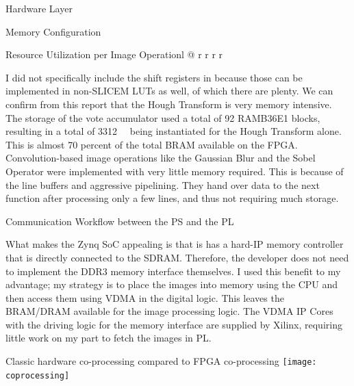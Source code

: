 \documentclass{matthijs}
\begin{document}
\begin{hoofdstuk}{Hardware Layer}
\begin{paragraaf}{Memory Configuration}
\begin{tabel}{Resource Utilization per Image Operation}{l @{\extracolsep{\fill}} r r r r}
			\end{tabel}

			I did not specifically include the shift registers in  because those can be implemented in non-SLICEM LUTs as well, of which there are plenty.
			We can confirm from this report that the Hough Transform is very memory intensive.
			The storage of the vote accumulator used a total of 92 RAMB36E1 blocks, resulting in a total of \qty{3312}{\kibi\bit} being instantiated for the Hough Transform alone.
			This is almost 70 percent of the total BRAM available on the FPGA.
			Convolution-based image operations like the Gaussian Blur and the Sobel Operator were implemented with very little memory required.
			This is because of the line buffers and aggressive pipelining.
			They hand over data to the next function after processing only a few lines, and thus not requiring much storage.

		\end{paragraaf}

		\clearpage

		\begin{paragraaf}{Communication Workflow between the PS and the PL}
			
			What makes the Zynq SoC appealing is that is has a hard-IP memory controller that is directly connected to the SDRAM.
			Therefore, the developer does not need to implement the DDR3 memory interface themselves.
			I used this benefit to my advantage; my strategy is to place the images into memory using the CPU and then access them using VDMA in the digital logic.
			This leaves the BRAM/DRAM available for the image processing logic.
			The VDMA IP Cores with the driving logic for the memory interface are supplied by Xilinx, requiring little work on my part to fetch the images in PL.

			\vspace{-0.6ex}
			\begin{figuur}{Classic hardware co-processing compared to FPGA co-processing}
				\singlespacing
				\texttt{[image: coprocessing]}
				\onehalfspacing
				\vspace{-2.3ex}
			\end{figuur}
			\vspace{-0.2ex}


\end{paragraaf}
\end{hoofdstuk}
\end{document}
